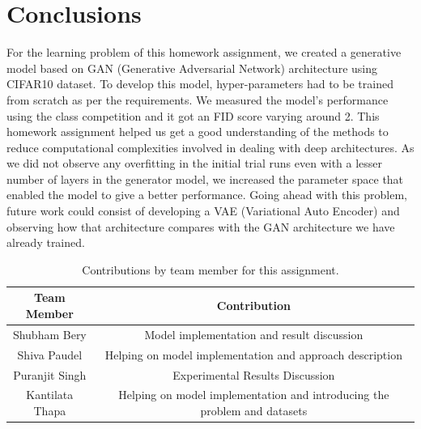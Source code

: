 \documentclass{article}
\begin{document}
\section{Conclusions}
For the learning problem of this homework assignment, we created a generative model based on GAN (Generative Adversarial Network) architecture using CIFAR10 dataset. To develop this model, hyper-parameters had to be trained from scratch as per the requirements. We measured the model’s performance using the class competition and it got an FID score varying around 2. This homework assignment helped us get a good understanding of the methods to reduce computational complexities involved in dealing with deep architectures. As we did not observe any overfitting in the initial trial runs even with a lesser number of layers in the generator model, we increased the parameter space that enabled the model to give a better performance. Going ahead with this problem, future work could consist of developing a VAE (Variational Auto Encoder) and observing how that architecture compares with the GAN architecture we have already trained. 

\begin{table}[h]
    \caption{Contributions by team member for this assignment.}
    \centering
    \begin{tabular}{|c|c|} \hline
    {\bf Team Member}     &  {\bf Contribution}  \\ \hline
    Shubham Bery     &   Model implementation and result discussion \\
    Shiva Paudel     &   Helping on model implementation and approach description \\
    Puranjit Singh   &   Experimental Results Discussion \\ 
    Kantilata Thapa  &   Helping on model implementation and introducing the problem and datasets \\ \hline
    \end{tabular}
    \label{tab:contribution}
\end{table}



\end{document}

